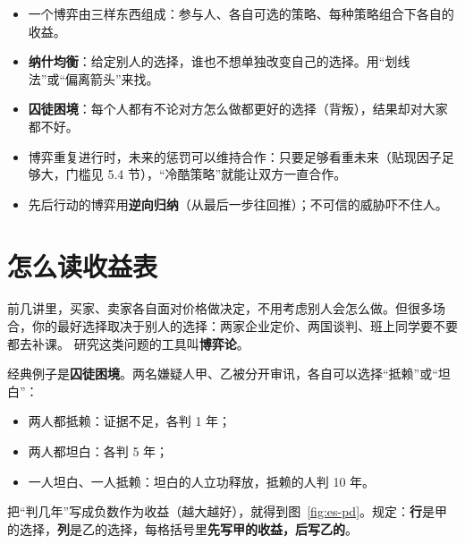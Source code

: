 
\newcommand{\gm}[8]{%
  \draw[mj thin] (0,0) rectangle (2,2); \draw[mj thin] (1,0) -- (1,2) (0,1) -- (2,1);
  \node[slab, left, mjAccent] at (0,1.5) {#1}; \node[slab, left, mjAccent] at (0,.5) {#2};
  \node[slab, above, mjSecond] at (.5,2) {#3}; \node[slab, above, mjSecond] at (1.5,2) {#4};
  \node[font=\small] at (.5,1.5) {#5}; \node[font=\small] at (1.5,1.5) {#6};
  \node[font=\small] at (.5,.5) {#7}; \node[font=\small] at (1.5,.5) {#8};}

\begin{keypoints}
\begin{itemize}
  \item 一个博弈由三样东西组成：参与人、各自可选的策略、每种策略组合下各自的收益。
  \item \textbf{纳什均衡}：给定别人的选择，谁也不想单独改变自己的选择。用“划线法”或“偏离箭头”来找。
  \item \textbf{囚徒困境}：每个人都有不论对方怎么做都更好的选择（背叛），结果却对大家都不好。
  \item 博弈重复进行时，未来的惩罚可以维持合作：只要足够看重未来（贴现因子足够大，门槛见 5.4 节），“冷酷策略”就能让双方一直合作。
  \item 先后行动的博弈用\textbf{逆向归纳}（从最后一步往回推）；不可信的威胁吓不住人。
\end{itemize}
\end{keypoints}

\section{怎么读收益表}

前几讲里，买家、卖家各自面对价格做决定，不用考虑别人会怎么做。但很多场合，你的最好选择取决于别人的选择：两家企业定价、两国谈判、班上同学要不要都去补课。
研究这类问题的工具叫\textbf{博弈论}。

经典例子是\textbf{囚徒困境}。两名嫌疑人甲、乙被分开审讯，各自可以选择“抵赖”或“坦白”：
\begin{itemize}
  \item 两人都抵赖：证据不足，各判 1 年；
  \item 两人都坦白：各判 5 年；
  \item 一人坦白、一人抵赖：坦白的人立功释放，抵赖的人判 10 年。
\end{itemize}
把“判几年”写成负数作为收益（越大越好），就得到图~\ref{fig:es-pd}。规定：\textbf{行}是甲的选择，\textbf{列}是乙的选择，每格括号里\textbf{先写甲的收益，后写乙的}。

